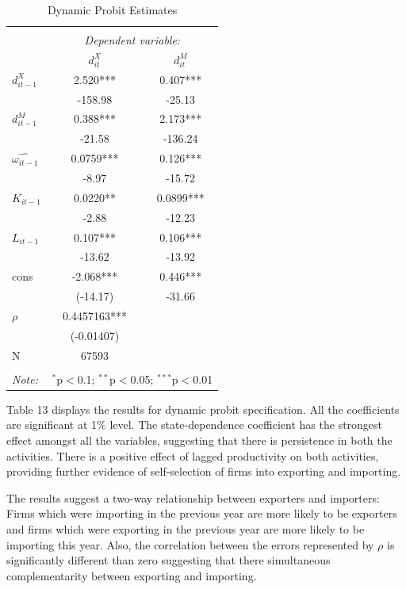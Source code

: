 \documentclass[11pt]{article}
\begin{document}
\begin{center}
\begin{table}[htbp]
\caption{Dynamic Probit Estimates}
\begin{tabular}{@{\extracolsep{5pt}}lcc} 
\\[-1.8ex]\hline 
\hline \\[-1.8ex] 
 & \multicolumn{2}{c}{\textit{Dependent variable:}} \\ 
 & $d_{it}^{X}$ & $d_{it}^{M}$ \\
\cline{2-3} 

$d_{it-1}^{X}$ & 2.520*** & 0.407*** \\
 & -158.98 & -25.13 \\
$d_{it-1}^{M}$ & 0.388*** & 2.173*** \\
 & -21.58 & -136.24 \\
$\hat{\omega_{it-1}}$ & 0.0759*** & 0.126*** \\
 & -8.97 & -15.72 \\
$K_{it-1}$ & 0.0220** & 0.0899*** \\
 & -2.88 & -12.23 \\
$L_{it-1}$ & 0.107*** & 0.106*** \\
 & -13.62 & -13.92 \\
cons & -2.068*** & 0.446*** \\
 & (-14.17) & -31.66 \\
$\rho$ & 0.4457163*** &  \\
 & (-0.01407) &  \\
N & 67593 &  \\
\hline 
\hline \\[-1.8ex] 
\textit{Note:}  & \multicolumn{2}{r}{$^{*}$p$<$0.1; $^{**}$p$<$0.05; $^{***}$p$<$0.01} \\ 
\end{tabular}
\end{table}
\end{center}
Table 13 displays the results for dynamic probit specification. All
  the coefficients are significant at 1\% level.  The
  state-dependence coefficient has the strongest effect amongst all
  the variables, suggesting that there is persistence in both the
  activities. There is a positive effect of lagged
  productivity on both activities, providing further evidence of
  self-selection of firms into exporting and importing. 

The results suggest a two-way relationship between exporters and
  importers: Firms which were importing in the previous year are more
  likely to be exporters and firms which were exporting in the
  previous year are more likely to be importing this year. Also, the
  correlation between the errors represented by $\rho$ is
  significantly different than zero suggesting that there simultaneous
  complementarity between exporting and importing.
\end{document}
